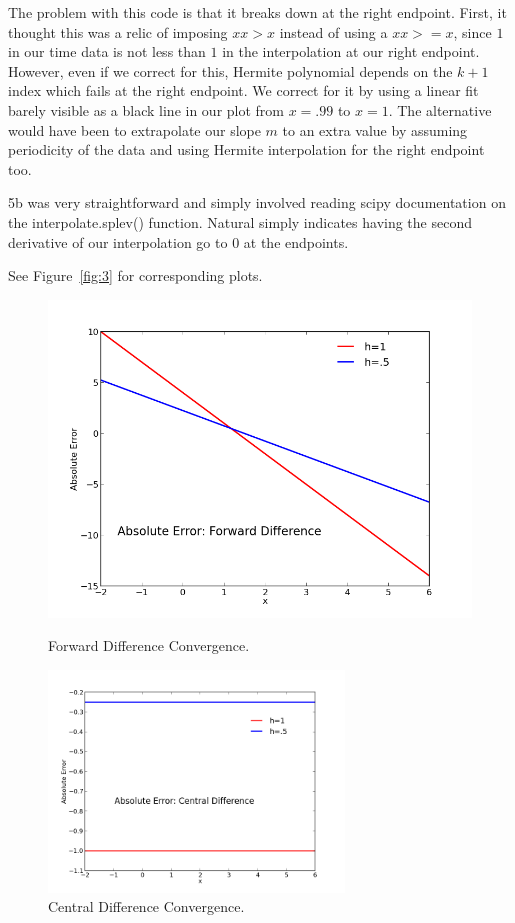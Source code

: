 \documentclass[11pt,letterpaper]{article}
\begin{document}
The problem with this code is that it breaks down at the right endpoint. First, it thought this was a relic of imposing $xx >x$ instead of using a $xx >= x$, since $1$ in our time data is not less than $1$ in the interpolation at our right endpoint. However, even if we correct for this, Hermite polynomial depends on the $k+1$ index which fails at the right endpoint. We correct for it by using a linear fit barely visible as a black line in our plot from $x=.99$ to $x=1$. The alternative would have been to extrapolate our slope $m$ to an extra value by assuming periodicity of the data and using Hermite interpolation for the right endpoint too.

5b was very straightforward and simply involved reading scipy documentation on the interpolate.splev() function. Natural simply indicates having the second derivative of our interpolation go to $0$ at the endpoints.

See Figure~\ref{fig:3} for corresponding plots.

\begin{figure}[bth]
\centering
\includegraphics[width=.7\textwidth]{ws22f.png}
\caption{Forward Difference Convergence.}
\label{fig:1}
\includegraphics[width=0.7\textwidth]{ws22c.png}
\caption{Central Difference Convergence.}
\label{}
\end{figure}
\end{document}
